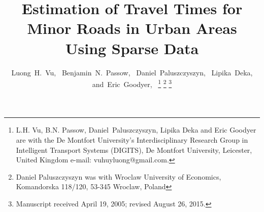 \documentclass[journal]{IEEEtran}
\begin{document}
%
\title{Estimation of Travel Times for Minor Roads in Urban Areas Using Sparse Data}
%
%
%

\author{Luong~H.~Vu,~
        Benjamin~N.~Passow,~
        Daniel~Paluszczyszyn,~
        Lipika~Deka,
        and~Eric~Goodyer,~%
\thanks{L.H. Vu, B.N. Passow, Daniel~Paluszczyszyn, Lipika Deka and Eric Goodyer are
 with the De Montfort University's Interdisciplinary Research Group in Intelligent Transport Systems (DIGITS), De Montfort University, Leicester, United Kingdom e-mail: vuhuyluong@gmail.com.}%
\thanks{Daniel Paluszczyszyn was with Wroclaw University of Economics, Komandorska 118/120, 53-345 Wroclaw, Poland}%
\thanks{Manuscript received April 19, 2005; revised August 26, 2015.}}

% 
%
\end{document}
